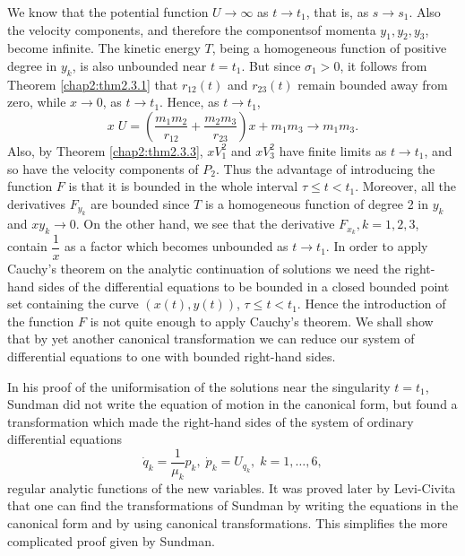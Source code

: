 We know that the potential function $U \to \infty$ as $t \to t_1$, that is, as $s \to s_1$. Also the velocity components, and therefore the components\pageoriginale of momenta $y_1, y_2, y_3$, become infinite. The kinetic energy $T$, being a homogeneous function of positive degree in $y_k$, is also unbounded near $t = t_1$. But since $\sigma_1 >0$, it follows from Theorem \ref{chap2:thm2.3.1} that $r_{12} (t)$ and $r_{23}(t)$ remain bounded away from zero, while $x \to 0$, as $t \to t_1$. Hence, as $t \to t_1$, 
$$
x \; U = \left(\frac{m_1 m_2}{r_{12}} + \frac{m_2 m_3}{r_{23}} \right) x+ m_1 m_3 \to m_1 m_3. 
$$
Also, by Theorem \ref{chap2:thm2.3.3}, $xV^2_1$ and $xV^2_3$ have finite limits as $t \to t_1$, and so have the velocity components of $P_2$. Thus the advantage of introducing the function $F$ is that it is bounded in the whole interval $\tau \leq t <t_1$. Moreover, all the derivatives $F_{y_k}$ are bounded since $T$ is a homogeneous function of degree 2 in $y_k$ and $xy_k \to 0$. On the other hand, we see that the derivative $F_{x_k}, k = 1,2,3$, contain $\dfrac{1}{x}$ as a factor which becomes unbounded as $t \to t_1$. In order to apply Cauchy's theorem on the analytic continuation of solutions we need the right-hand sides of the differential equations to be bounded in a closed bounded point set containing the curve $(x(t), y(t))$, $\tau \leq t <t_1$. Hence the introduction of the function $F$ is not quite enough to apply Cauchy's theorem. We shall show that by  yet another canonical transformation we can reduce our system of differential equations to one with bounded right-hand sides.

In his proof of the uniformisation of the solutions near the singularity $t = t_1$, Sundman did not write the equation of motion in the canonical form, but found a transformation which made the right-hand sides of the system of ordinary differential equations
$$
\dot{q}_k = \frac{1}{\mu_k} p_k, \; \dot{p}_k = U_{q_k}, \; k =1, \ldots, 6,
$$\pageoriginale
regular analytic functions of the new variables. It was proved later by Levi-Civita that one can find the transformations of Sundman by writing the equations in the canonical form and by using canonical transformations. This simplifies the more complicated proof given by Sundman.

